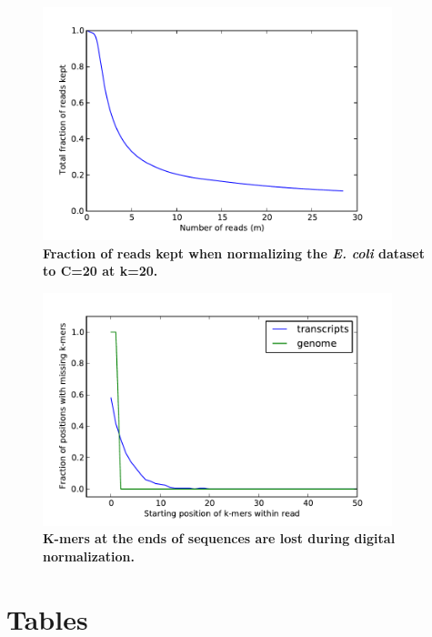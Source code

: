 \documentclass[10pt]{article}
\begin{document}
\begin{figure}
\centerline{\includegraphics[width=4in]{diginorm-accumulation.pdf}}
\caption{
{\bf Fraction of reads kept when normalizing the {\em E. coli} dataset to C=20 at k=20.}}
\label{fig:accumulate}
\end{figure}

\begin{figure}
\centerline{\includegraphics[width=4in]{diginorm-endbias.pdf}}
\caption{
{\bf K-mers at the ends of sequences are lost during digital normalization.}}
\label{fig:endloss}
\end{figure}

\section*{Tables}
\end{document}
